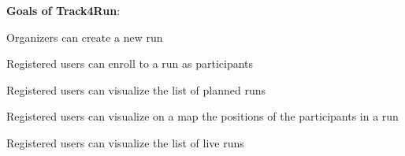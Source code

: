 \begin{goalList}
\begin{enumerate}[label={[}G\arabic*{]}]
\newpage

\textbf{Goals of Track4Run}:

    \item \label{goal:run1}Organizers can create a new run
    \item \label{goal:run2}Registered users can enroll to a run as participants
    \item \label{goal:run3}Registered users can visualize the list of planned runs
    \item \label{goal:run4}Registered users can visualize on a map the positions of the        participants in a run
    \item\label{goal:run5}Registered users can visualize the list of live runs
    
\end{enumerate}
\end{goalList}

